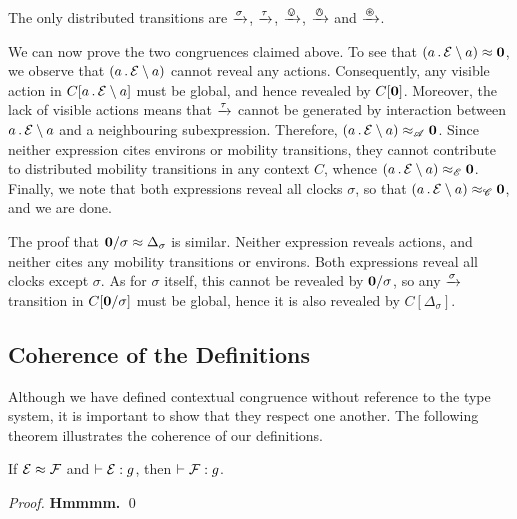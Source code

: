 \documentclass[orivec,envcountsame]{llncs}
\newcommand{\Eq}{\approx}
\newcommand{\EqA}{\mathrel{\Eq_{\mathscr{A}}}}
\newcommand{\EqC}{\mathrel{\Eq_{\mathscr{C}}}}
\newcommand{\EqE}{\mathrel{\Eq_{\mathscr{E}}}}
\newcommand{\Does}[1]{\xderives{#1}}
\newcommand{\Theorem}{\vdash}
\newcommand{\OfType}{\mathrel{:}}
\begin{document}
\begin{proposition}
The only distributed transitions are $\Does{\sigma}$, $\Does{\tau}$, $\Does{\tin}$, $\Does{\tout}$ and $\Does{\topen}$.
\end{proposition}

We can now prove the two congruences claimed above. To see that $\left(a\pref\expr \res{a}\right) \Eq \nil$, we observe that $\left(a\,.\,\text{$\mathcal{E}$} \setminus {a}\right)$ cannot reveal any actions. Consequently, any visible action in $C[a\,.\,\text{$\mathcal{E}$} \setminus {a}]$ must be global, and hence revealed by $C[\textbf{0}]$. Moreover, the lack of visible actions means that $\Does{\tau}$ cannot be generated by interaction between $a\,.\,\text{$\mathcal{E}$} \setminus {a}$ and a neighbouring subexpression. Therefore, $\left(a\pref\expr \res{a}\right) \EqA \nil$. Since neither expression cites environs or mobility transitions, they cannot contribute to distributed mobility transitions in any context $C$, whence $\left(a\pref\expr \res{a}\right) \EqE \nil$. Finally, we note that both expressions reveal all clocks $\sigma$, so that $\left(a\pref\expr \res{a}\right) \EqC \nil$, and we are done.

The proof that $\nil \hide \sigma \Eq \Delta_\sigma$ is similar. Neither expression reveals actions, and neither cites any mobility transitions or environs. Both expressions reveal all clocks except $\sigma$. As for $\sigma$ itself, this cannot be revealed by $\textbf{0} / {\sigma}$, so any $\Does{\sigma}$ transition in $C[\textbf{0} / {\sigma}]$ must be global, hence it is also revealed by $C[\Delta_\sigma]$.

\subsection{Coherence of the Definitions}
Although we have defined contextual congruence without reference to the type system, it is important to show that they respect one another. The following theorem illustrates the coherence of our definitions.

\begin{theorem}
If $\expr \Eq \exprb$ and $\Theorem \expr \OfType g$, then $\Theorem \exprb \OfType g$.
\end{theorem}
\begin{proof}
\textbf{Hmmmm.} 
\qed \end{proof}



\end{document}
